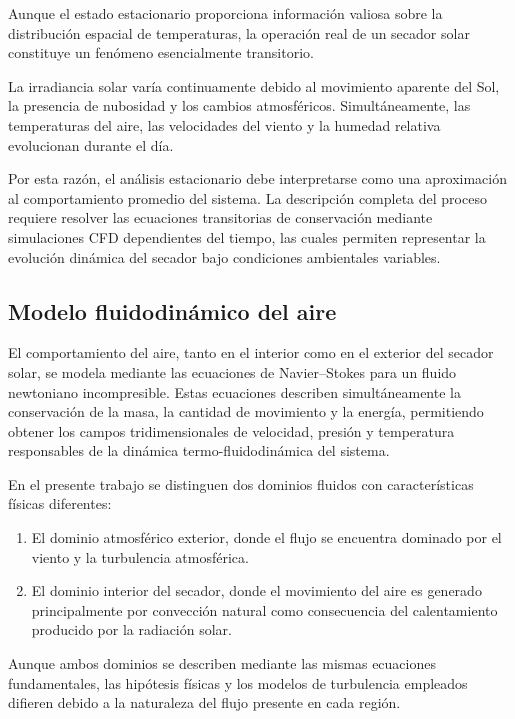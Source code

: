 Aunque el estado estacionario proporciona información valiosa sobre la distribución espacial de temperaturas, la operación real de un secador solar constituye un fenómeno esencialmente transitorio.

La irradiancia solar varía continuamente debido al movimiento aparente del Sol, la presencia de nubosidad y los cambios atmosféricos. Simultáneamente, las temperaturas del aire, las velocidades del viento y la humedad relativa evolucionan durante el día.

Por esta razón, el análisis estacionario debe interpretarse como una aproximación al comportamiento promedio del sistema. La descripción completa del proceso requiere resolver las ecuaciones transitorias de conservación mediante simulaciones CFD dependientes del tiempo, las cuales permiten representar la evolución dinámica del secador bajo condiciones ambientales variables.

\subsection{Modelo fluidodinámico del aire}

El comportamiento del aire, tanto en el interior como en el exterior del secador solar, se modela mediante las ecuaciones de Navier--Stokes para un fluido newtoniano incompresible. Estas ecuaciones describen simultáneamente la conservación de la masa, la cantidad de movimiento y la energía, permitiendo obtener los campos tridimensionales de velocidad, presión y temperatura responsables de la dinámica termo-fluidodinámica del sistema.

En el presente trabajo se distinguen dos dominios fluidos con características físicas diferentes:

\begin{enumerate}

\item El dominio atmosférico exterior, donde el flujo se encuentra dominado por el viento y la turbulencia atmosférica.

\item El dominio interior del secador, donde el movimiento del aire es generado principalmente por convección natural como consecuencia del calentamiento producido por la radiación solar.

\end{enumerate}

Aunque ambos dominios se describen mediante las mismas ecuaciones fundamentales, las hipótesis físicas y los modelos de turbulencia empleados difieren debido a la naturaleza del flujo presente en cada región.

